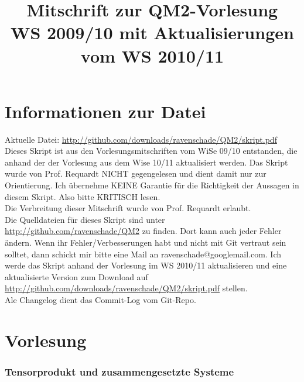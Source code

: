 \documentclass[twoside,a4paper]{scrartcl}
\renewcommand{\1}{\mathds{1}}
\begin{document}

\clearpage
\thispagestyle{empty}

	
\title{\huge  \textbf{Mitschrift zur QM2-Vorlesung}\\
			  \textbf{WS 2009/10 mit Aktualisierungen vom WS 2010/11}}
		
\maketitle
\newpage
\thispagestyle{empty}
\mbox{}
\newpage
\tableofcontents
\newpage
\thispagestyle{empty}
\mbox{}
\newpage
\newpage
\part{Informationen zur Datei}
Aktuelle Datei: \url{http://github.com/downloads/ravenschade/QM2/skript.pdf}\\
Dieses Skript ist aus den Vorlesungsmitschriften vom WiSe 09/10 entstanden, die anhand der der Vorlesung aus dem Wise 10/11 aktualisiert werden. Das Skript wurde von Prof. Requardt NICHT gegengelesen und dient damit nur zur Orientierung. Ich übernehme KEINE Garantie für die Richtigkeit der Aussagen in diesem Skript. Also bitte KRITISCH lesen.\\
Die Verbreitung dieser Mitschrift wurde von Prof. Requardt erlaubt.\\
Die Quelldateien für dieses Skript sind unter \url{http://github.com/ravenschade/QM2} zu finden. Dort kann auch jeder Fehler ändern. Wenn ihr Fehler/Verbesserungen habt und nicht mit Git vertraut sein solltet, dann schickt mir bitte eine Mail an ravenschade@googlemail.com.
Ich werde das Skript anhand der Vorlesung im WS 2010/11 aktualisieren und eine aktualisierte Version zum Download auf \url{http://github.com/downloads/ravenschade/QM2/skript.pdf} stellen.\\
Ale Changelog dient das Commit-Log vom Git-Repo.
\newpage

%
%
\part{Vorlesung}
\section{Tensorprodukt und zusammengesetzte Systeme}
\end{document}
